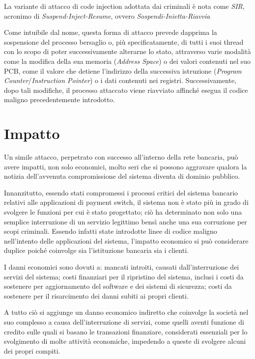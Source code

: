 \documentclass[10pt,a4paper, titlepage]{report}
\begin{document}
La variante di attacco di code injection adottata dai criminali è nota come \textit{SIR}, acronimo di \textit{Suspend-Inject-Resume}, ovvero \textit{Sospendi-Inietta-Riavvia}

Come intuibile dal nome, questa forma di attacco prevede dapprima la sospensione del processo bersaglio o, più specificatamente, di tutti i suoi thread con lo scopo di poter successivamente alterarne lo stato, attraverso varie modalità come la modifica della sua memoria (\textit{Address Space}) o dei valori contenuti nel suo PCB, come il valore che detiene l'indirizzo della successiva istruzione (\textit{Program Counter}/\textit{Instruction Pointer}) o i dati contenuti nei registri. Successivamente, dopo tali modifiche, il processo attaccato viene riavviato affinché esegua il codice maligno precedentemente introdotto.

\section{Impatto}

Un simile attacco, perpetrato con successo all'interno della rete bancaria, può avere impatti, non solo economici, molto seri che si possono aggravare qualora la notizia dell'avvenuta compromissione del sistema diventa di dominio pubblico.

Innanzitutto, essendo stati compromessi i processi critici del sistema bancario relativi alle applicazioni di payment switch, il sistema non è stato più in grado di svolgere le funzioni per cui è stato progettato; ciò ha determinato non solo una semplice interruzione di un servizio legittimo bensì anche una sua corruzione per scopi criminali. Essendo infatti state introdotte linee di codice maligno nell'intento delle applicazioni del sistema, l'impatto economico si può considerare duplice poiché coinvolge sia l'istituzione bancaria sia i clienti. 

I danni economici sono dovuti a: mancati introiti, causati dall'interruzione dei servizi del sistema; costi finanziari per il ripristino del sistema, inclusi i costi da sostenere per aggiornamento del software e dei sistemi di sicurezza; costi da sostenere per il risarcimento dei danni subiti ai propri clienti.

A tutto ciò si aggiunge un danno economico indiretto che coinvolge la società nel suo complesso a causa dell'interruzione di servizi, come quelli aventi funzione di credito sulle quali si basano le transazioni finanziare, considerati essenziali per lo svolgimento di molte attività economiche, impedendo a queste di svolgere alcuni dei propri compiti.
\end{document}

